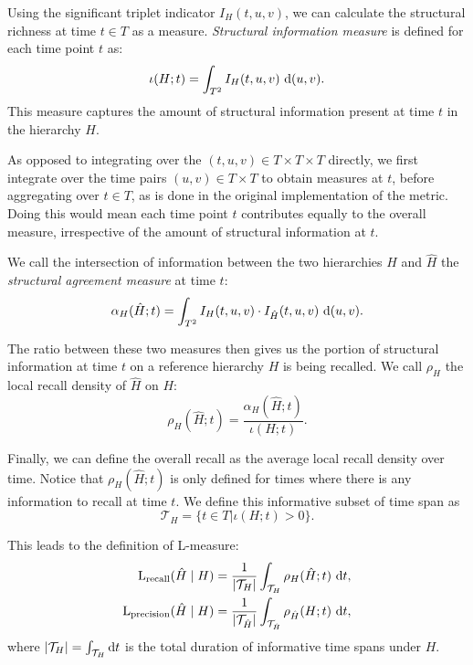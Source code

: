 Using the significant triplet indicator $I_H(t,u,v)$, we can calculate the structural richness at time $t\in T$ as a measure.
\emph{Structural information measure} is defined for each time point $t$ as:
\begin{equation}
    \iota(H;t) = \int_{T^2} I_H(t,u,v)\,\mathop{}\!\mathrm{d}(u,v).
    \label{eq:local_richness}
\end{equation}
This measure captures the amount of structural information present at time \(t\) in the hierarchy \(H\).

As opposed to integrating over the $(t,u,v) \in T \times T \times T$ directly, we first integrate over the time pairs \((u,v) \in T \times T\) to obtain measures at \(t\), before aggregating over $t \in T$, as is done in the original implementation of the metric.
Doing this would mean each time point \(t\) contributes equally to the overall measure, irrespective of the amount of structural information at $t$.

We call the intersection of information between the two hierarchies \(H\) and \(\hat{H}\) the \emph{structural agreement measure} at time \(t\):
\begin{equation}
    \alpha_H(\hat{H};t) = \int_{T^2} I_H(t,u,v)\cdot I_{\hat{H}}(t,u,v)\,\mathop{}\!\mathrm{d}(u,v).
    \label{eq:local_agreement}
\end{equation}

The ratio between these two measures then gives us the portion of structural information at time $t$ on a reference hierarchy \(H\) is being recalled.
We call $\rho_H$ the local recall density of $\hat{H}$ on $H$:
\begin{equation}
    \rho_H(\hat{H};t) = \frac{\alpha_H(\hat{H};t)}{\iota(H;t)}.
    \label{eq:local_recall}
\end{equation}

Finally, we can define the overall recall as the average local recall density over time.
Notice that $\rho_H(\hat{H};t)$ is only defined for times where there is any information to recall at time $t$.
We define this informative subset of time span as 
\[
    \mathcal{T}_H = \{t \in T | \iota(H;t) > 0\}.
\]

This leads to the definition of L-measure:
\begin{align}
    \mathrm{L}_{\mathrm{recall}}(\hat{H} \mid H) 
    &= \frac{1}{|\mathcal{T}_H|}
    \int_{\mathcal{T}_H} \rho_H(\hat{H};t)\, \mathop{}\!\mathrm{d} t, \nonumber \\
    \mathrm{L}_{\mathrm{precision}}(\hat{H} \mid H) 
    &= \frac{1}{|\mathcal{T}_{\hat{H}}|}
    \int_{\mathcal{T}_{\hat{H}}} \rho_{\hat{H}}(H;t)\, \mathop{}\!\mathrm{d} t,
    \label{eq:new_lmeasure}
\end{align}
where \(|\mathcal{T}_H| = \int_{\mathcal{T}_H} \mathop{}\!\mathrm{d} t\) is the total duration of informative time spans under $H$.


